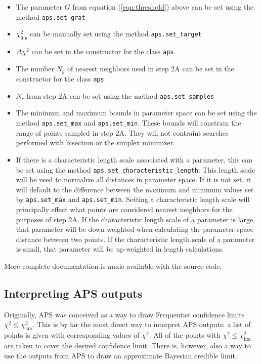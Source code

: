 \documentclass[useAMS,usenatbib]{aastex}
\begin{document}
\begin{itemize}
\item The parameter $G$ from equation (\ref{eqn:threshold}) above can be set using the method
\verb|aps.set_grat|
\\
\item $\chi^2_\text{lim}$ can be manually set using the method \verb|aps.set_target|
\\
\item $\Delta \chi^2$ can be set in the constructor for the class \verb|aps|.
\\
\item The number $N_g$ of nearest neighbors used in step 2A can be set in the constructor
for the class \verb|aps|
\\
\item $N_c$ from step 2A can be set using the method \verb|aps.set_samples|
\\
\item The minimum and maximum bounds in parameter space can be set using the 
method \verb|aps.set_max| and \verb|aps.set_min|.  These bounds will constrain the range of
points sampled in step 2A.  They will not contraint searches performed with bisection or the 
simplex minimizer.
\\
\item If there is a characteristic length scale associated with a parameter, this can be set
using the method \verb|aps.set_characteristic_length|.  This length scale will be used to
normalize all distances in parameter space.  If it is not set, it will default to the
difference between the maximum and minimum values set by \verb|aps.set_max| and
\verb|aps.set_min|.  Setting a characteristic length scale will principally
effect what points are considered nearest neighbors for the purposes of step 2A.
If the characteristic length scale of a parameter is large, that parameter will
be down-weighted when calculating the parameter-space distance between two points.
If the characteristic length scale of a parameter is small, that parameter will
be up-weighted in length calculations.
\end{itemize}

More complete documentation is made available with the source code.

\subsection{Interpreting APS outputs}
\label{sec:bayes}

Originally, APS was conceived as a way to draw Frequentist confidence limits $\chi^2\le\chi^2_\text{lim}$. 
This is by far the most direct way to interpret APS outputs: a list of points is given with
corresponding values of $\chi^2$.  All of the points with $\chi^2\le\chi^2_\text{lim}$ are
taken to cover the desired confidence limit.  There is, however, also a way to use the
outputs from APS to draw an approximate Bayesian credible limit.
\end{document}
